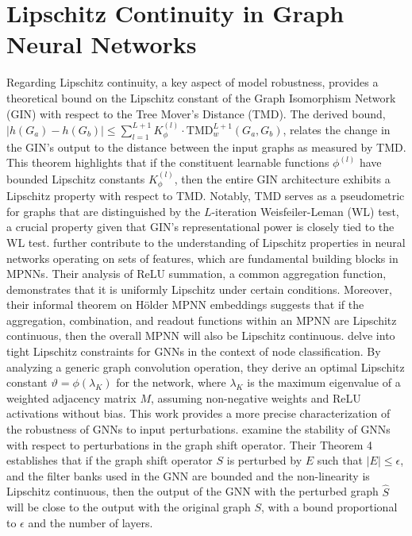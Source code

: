 \documentclass[11pt]{article}\usepackage{amsmath,amssymb,amsthm,bbm}
\newcommand{\1}{\mathbbm{1}}
\begin{document}
\title{}
\author{}
\date{\today}

%





\section*{Lipschitz Continuity in Graph Neural Networks}

Regarding Lipschitz continuity, a key aspect of model robustness, \cite{chuang2022tree} provides a theoretical bound on the Lipschitz constant of the Graph Isomorphism Network (GIN) with respect to the Tree Mover’s Distance (TMD). The derived bound, $|h(G_a)-h(G_b)| \le \sum_{l=1}^{L+1} K^{(l)}_{\phi} \cdot \mathrm{TMD}_w^{L+1}(G_a,G_b)$, relates the change in the GIN's output to the distance between the input graphs as measured by TMD. This theorem highlights that if the constituent learnable functions $\phi^{(l)}$ have bounded Lipschitz constants $K^{(l)}_{\phi}$, then the entire GIN architecture exhibits a Lipschitz property with respect to TMD. Notably, TMD serves as a pseudometric for graphs that are distinguished by the $L$-iteration Weisfeiler-Leman (WL) test, a crucial property given that GIN's representational power is closely tied to the WL test. \cite{davidson2024h} further contribute to the understanding of Lipschitz properties in neural networks operating on sets of features, which are fundamental building blocks in MPNNs. Their analysis of ReLU summation, a common aggregation function, demonstrates that it is uniformly Lipschitz under certain conditions. Moreover, their informal theorem on Hölder MPNN embeddings suggests that if the aggregation, combination, and readout functions within an MPNN are Lipschitz continuous, then the overall MPNN will also be Lipschitz continuous. \cite{juvina2024training} delve into tight Lipschitz constraints for GNNs in the context of node classification. By analyzing a generic graph convolution operation, they derive an optimal Lipschitz constant $\vartheta = \phi(\lambda_K)$ for the network, where $\lambda_K$ is the maximum eigenvalue of a weighted adjacency matrix $M$, assuming non-negative weights and ReLU activations without bias. This work provides a more precise characterization of the robustness of GNNs to input perturbations. \cite{gama2020stability} examine the stability of GNNs with respect to perturbations in the graph shift operator. Their Theorem 4 establishes that if the graph shift operator $S$ is perturbed by $E$ such that $|E|\le\epsilon$, and the filter banks used in the GNN are bounded and the non-linearity is Lipschitz continuous, then the output of the GNN with the perturbed graph $\hat{S}$ will be close to the output with the original graph $S$, with a bound proportional to $\epsilon$ and the number of layers.




\end{document}
